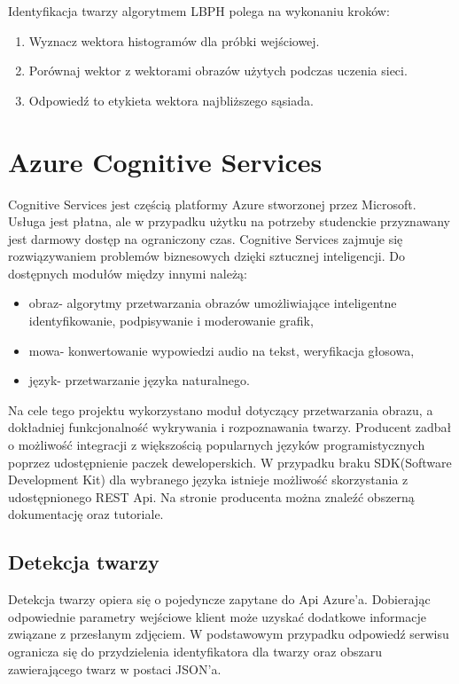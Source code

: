 Identyfikacja twarzy algorytmem LBPH polega na wykonaniu kroków:
\begin{enumerate}
\item Wyznacz wektora histogramów dla próbki wejściowej.
\item Porównaj wektor z wektorami obrazów użytych podczas uczenia sieci.
\item Odpowiedź to etykieta wektora najbliższego sąsiada.
\end{enumerate}

\section{Azure Cognitive Services}\label{azurecs}
Cognitive Services jest częścią platformy Azure stworzonej przez Microsoft. Usługa jest płatna, ale w przypadku użytku na potrzeby studenckie przyznawany jest darmowy dostęp na ograniczony czas. Cognitive Services zajmuje się rozwiązywaniem problemów biznesowych dzięki sztucznej inteligencji. Do dostępnych modułów między innymi należą:
\begin{itemize}
\item obraz- algorytmy przetwarzania obrazów umożliwiające inteligentne identyfikowanie, podpisywanie i moderowanie grafik,
\item mowa- konwertowanie wypowiedzi audio na tekst, weryfikacja głosowa,
\item język- przetwarzanie języka naturalnego.
\end{itemize}
Na cele tego projektu wykorzystano moduł dotyczący przetwarzania obrazu, a dokładniej funkcjonalność wykrywania i rozpoznawania twarzy. Producent zadbał o możliwość integracji z większością popularnych języków programistycznych poprzez udostępnienie paczek deweloperskich. W przypadku braku SDK(Software Development Kit) dla wybranego języka istnieje możliwość skorzystania z udostępnionego REST Api. Na stronie producenta można znaleźć obszerną dokumentację \cite{acs_doc} oraz tutoriale.

\subsection{Detekcja twarzy}
Detekcja twarzy opiera się o pojedyncze zapytane do Api Azure'a. Dobierając odpowiednie parametry wejściowe klient może uzyskać dodatkowe informacje związane z przesłanym zdjęciem. W podstawowym przypadku odpowiedź serwisu ogranicza się do przydzielenia identyfikatora dla twarzy oraz obszaru zawierającego twarz w postaci JSON'a.

